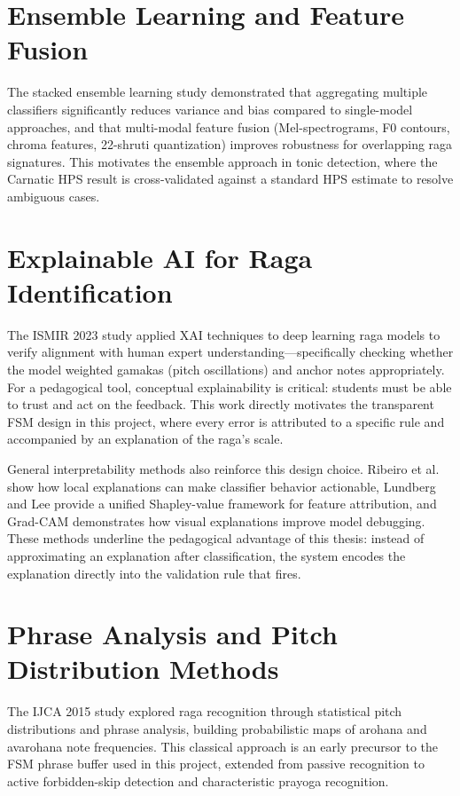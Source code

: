 \documentclass[12pt,a4paper]{report}
\numberwithin{equation}{chapter}
\begin{document}
\section{Ensemble Learning and Feature Fusion}
The stacked ensemble learning study \cite{arxiv2022carnatic} demonstrated that aggregating multiple classifiers significantly reduces variance and bias compared to single-model approaches, and that multi-modal feature fusion (Mel-spectrograms, F0 contours, chroma features, 22-shruti quantization) improves robustness for overlapping raga signatures. This motivates the ensemble approach in tonic detection, where the Carnatic HPS result is cross-validated against a standard HPS estimate to resolve ambiguous cases.

\section{Explainable AI for Raga Identification}
The ISMIR 2023 study \cite{ismir2023explainable} applied XAI techniques to deep learning raga models to verify alignment with human expert understanding---specifically checking whether the model weighted gamakas (pitch oscillations) and anchor notes appropriately. For a pedagogical tool, conceptual explainability is critical: students must be able to trust and act on the feedback. This work directly motivates the transparent FSM design in this project, where every error is attributed to a specific rule and accompanied by an explanation of the raga's scale.

General interpretability methods also reinforce this design choice. Ribeiro et al. \cite{ribeiro2016why} show how local explanations can make classifier behavior actionable, Lundberg and Lee \cite{lundberg2017unified} provide a unified Shapley-value framework for feature attribution, and Grad-CAM \cite{selvaraju2017gradcam} demonstrates how visual explanations improve model debugging. These methods underline the pedagogical advantage of this thesis: instead of approximating an explanation after classification, the system encodes the explanation directly into the validation rule that fires.

\section{Phrase Analysis and Pitch Distribution Methods}
The IJCA 2015 study \cite{ijca2015phrase} explored raga recognition through statistical pitch distributions and phrase analysis, building probabilistic maps of arohana and avarohana note frequencies. This classical approach is an early precursor to the FSM phrase buffer used in this project, extended from passive recognition to active forbidden-skip detection and characteristic prayoga recognition.
\end{document}

